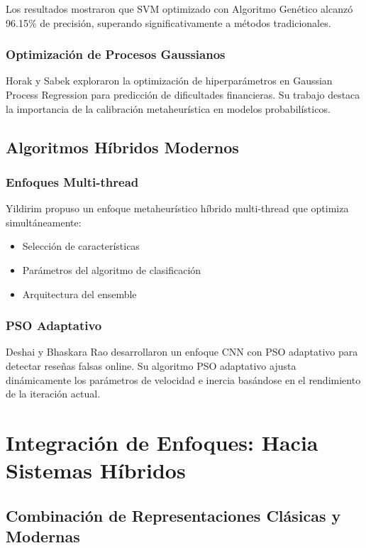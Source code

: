 Los resultados mostraron que SVM optimizado con Algoritmo Genético alcanzó 96.15\% de precisión, superando significativamente a métodos tradicionales.

\subsubsection{Optimización de Procesos Gaussianos}

Horak y Sabek \cite{horak2023gaussian} exploraron la optimización de hiperparámetros en Gaussian Process Regression para predicción de dificultades financieras. Su trabajo destaca la importancia de la calibración metaheurística en modelos probabilísticos.

\subsection{Algoritmos Híbridos Modernos}

\subsubsection{Enfoques Multi-thread}

Yildirim \cite{yildirim2023novel} propuso un enfoque metaheurístico híbrido multi-thread que optimiza simultáneamente:
\begin{itemize}
    \item Selección de características
    \item Parámetros del algoritmo de clasificación
    \item Arquitectura del ensemble
\end{itemize}

\subsubsection{PSO Adaptativo}

Deshai y Bhaskara Rao \cite{deshai2023unmasking} desarrollaron un enfoque CNN con PSO adaptativo para detectar reseñas falsas online. Su algoritmo PSO adaptativo ajusta dinámicamente los parámetros de velocidad e inercia basándose en el rendimiento de la iteración actual.

\section{Integración de Enfoques: Hacia Sistemas Híbridos}
\label{sec:integracion_enfoques}

\subsection{Combinación de Representaciones Clásicas y Modernas}

